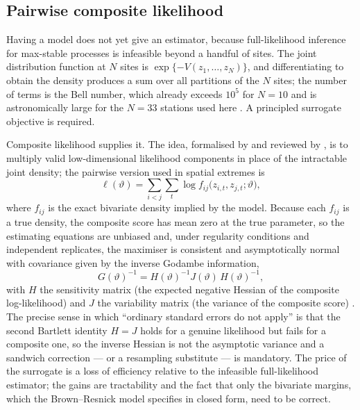 \subsection{Pairwise composite likelihood}\label{sec:lit-cl}

Having a model does not yet give an estimator, because full-likelihood inference for max-stable processes is infeasible beyond a handful of sites. The joint distribution function at \(N\) sites is \(\exp\{-V(z_1,\dots,z_N)\}\), and differentiating to obtain the density produces a sum over all partitions of the \(N\) sites; the number of terms is the Bell number, which already exceeds \(10^5\) for \(N=10\) and is astronomically large for the \(N=33\) stations used here \citep{padoan2010}. A principled surrogate objective is required.

Composite likelihood supplies it. The idea, formalised by \citet{lindsay1988} and reviewed by \citet{varin2011}, is to multiply valid low-dimensional likelihood components in place of the intractable joint density; the pairwise version used in spatial extremes is
\[
    \ell(\vartheta)=\sum_{i<j}\sum_{t}\log f_{ij}\bigl(z_{i,t},z_{j,t};\vartheta\bigr),
\]
where \(f_{ij}\) is the exact bivariate density implied by the model. Because each \(f_{ij}\) is a true density, the composite score has mean zero at the true parameter, so the estimating equations are unbiased and, under regularity conditions and independent replicates, the maximiser is consistent and asymptotically normal with covariance given by the inverse Godambe information,
\[
    G(\vartheta)^{-1}=H(\vartheta)^{-1}J(\vartheta)\,H(\vartheta)^{-1},
\]
with \(H\) the sensitivity matrix (the expected negative Hessian of the composite log-likelihood) and \(J\) the variability matrix (the variance of the composite score) \citep{varin2011,padoan2010}. The precise sense in which ``ordinary standard errors do not apply'' is that the second Bartlett identity \(H=J\) holds for a genuine likelihood but fails for a composite one, so the inverse Hessian is not the asymptotic variance and a sandwich correction --- or a resampling substitute --- is mandatory. The price of the surrogate is a loss of efficiency relative to the infeasible full-likelihood estimator; the gains are tractability and the fact that only the bivariate margins, which the Brown--Resnick model specifies in closed form, need to be correct.

